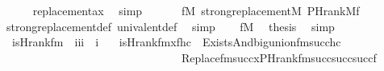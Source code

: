 \begin{isabellebody}
\ \ \ \ \isamarkupfalse%
\ replacement{\isacharunderscore}{\kern0pt}ax\ \isamarkupfalse%
\ simp\isanewline
\ \ \isamarkupfalse%
\isanewline
\ \ \isamarkupfalse%
\ {\isachardoublequoteopen}{\isasymforall}f{}{\isasymin}M{\isachardot}{\kern0pt}\ strong{\isacharunderscore}{\kern0pt}replacement{\isacharparenleft}{\kern0pt}{\isacharhash}{\kern0pt}{\isacharhash}{\kern0pt}M{\isacharcomma}{\kern0pt}\ PHrank{\isacharparenleft}{\kern0pt}{\isacharhash}{\kern0pt}{\isacharhash}{\kern0pt}M{\isacharcomma}{\kern0pt}f{}{\isacharparenright}{\kern0pt}{\isacharparenright}{\kern0pt}{\isachardoublequoteclose}\isanewline
\ \ \ \ \isamarkupfalse%
\ strong{\isacharunderscore}{\kern0pt}replacement{\isacharunderscore}{\kern0pt}def\ univalent{\isacharunderscore}{\kern0pt}def\ \isamarkupfalse%
\ simp\isanewline
\ \ \isamarkupfalse%
\ {\isacartoucheopen}f{\isasymin}M{\isacartoucheclose}\ \isamarkupfalse%
\ {\isacharquery}{\kern0pt}thesis\ \isamarkupfalse%
\ simp\isanewline
{}\isamarkupfalse%
%
\endisatagproof
{\isafoldproof}%
%
\isadelimproof
\isanewline
%
\endisadelimproof
\isanewline
\isanewline
\isanewline
{}\isamarkupfalse%
\isanewline
\ \ is{\isacharunderscore}{\kern0pt}Hrank{\isacharunderscore}{\kern0pt}fm\ {\isacharcolon}{\kern0pt}{\isacharcolon}{\kern0pt}\ {\isachardoublequoteopen}{\isacharbrackleft}{\kern0pt}i{\isacharcomma}{\kern0pt}i{\isacharcomma}{\kern0pt}i{\isacharbrackright}{\kern0pt}\ {\isasymRightarrow}\ i{\isachardoublequoteclose}\ \isanewline
\ \ {\isachardoublequoteopen}is{\isacharunderscore}{\kern0pt}Hrank{\isacharunderscore}{\kern0pt}fm{\isacharparenleft}{\kern0pt}x{\isacharcomma}{\kern0pt}f{\isacharcomma}{\kern0pt}hc{\isacharparenright}{\kern0pt}\ {\isasymequiv}\ Exists{\isacharparenleft}{\kern0pt}And{\isacharparenleft}{\kern0pt}big{\isacharunderscore}{\kern0pt}union{\isacharunderscore}{\kern0pt}fm{\isacharparenleft}{\kern0pt}{}{\isacharcomma}{\kern0pt}succ{\isacharparenleft}{\kern0pt}hc{\isacharparenright}{\kern0pt}{\isacharparenright}{\kern0pt}{\isacharcomma}{\kern0pt}\isanewline
\ \ \ \ \ \ \ \ \ \ \ \ \ \ \ \ \ \ \ \ \ \ \ \ \ \ \ \ \ \ \ \ Replace{\isacharunderscore}{\kern0pt}fm{\isacharparenleft}{\kern0pt}succ{\isacharparenleft}{\kern0pt}x{\isacharparenright}{\kern0pt}{\isacharcomma}{\kern0pt}PHrank{\isacharunderscore}{\kern0pt}fm{\isacharparenleft}{\kern0pt}succ{\isacharparenleft}{\kern0pt}succ{\isacharparenleft}{\kern0pt}succ{\isacharparenleft}{\kern0pt}f{\isacharparenright}{\kern0pt}{\isacharparenright}{\kern0pt}{\isacharparenright}{\kern0pt}{\isacharcomma}{\kern0pt}{}{\isacharcomma}{\kern0pt}{}{\isacharparenright}{\kern0pt}{\isacharcomma}{\kern0pt}{}{\isacharparenright}{\kern0pt}{\isacharparenright}{\kern0pt}{\isacharparenright}{\kern0pt}{\isachardoublequoteclose}\isanewline

\end{isabellebody}
